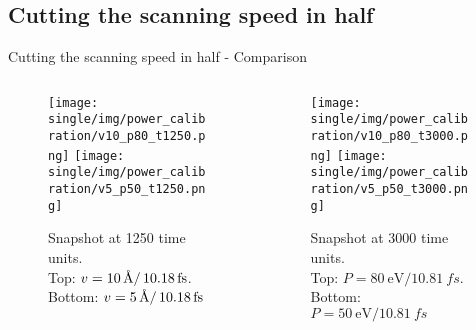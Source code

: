 \subsection{Cutting the scanning speed in half}
\begin{frame}{Cutting the scanning speed in half - Comparison}
\vspace{-1.1\baselineskip}
\begin{columns}
	\begin{column}{0.5\textwidth}
		\begin{figure}
			\centering
			\captionsetup{justification=centering}
			\texttt{[image: single/img/power\_calibration/v10\_p80\_t1250.png]}
			\texttt{[image: single/img/power\_calibration/v5\_p50\_t1250.png]}
			\caption{Snapshot at 1250 time units.\\Top: $v = \SI{10}{\angstrom \per \ensuremath{\,\SI{10.18}{fs}}}$. Bottom: $v = \SI{5}{\angstrom \per \ensuremath{\,\SI{10.18}{fs}}}$}
		\end{figure}
	\end{column}
	\begin{column}{0.5\textwidth}
		\begin{figure}
			\centering
			\captionsetup{justification=centering}
			\texttt{[image: single/img/power\_calibration/v10\_p80\_t3000.png]}
			\texttt{[image: single/img/power\_calibration/v5\_p50\_t3000.png]}
			\caption{Snapshot at 3000 time units.\\Top: $P = \SI{80}{\electronvolt}/\SI{10.81}{fs}$. Bottom: $P = \SI{50}{\electronvolt}/\SI{10.81}{fs}$}
		\end{figure}
	\end{column}
\end{columns}
\end{frame}
